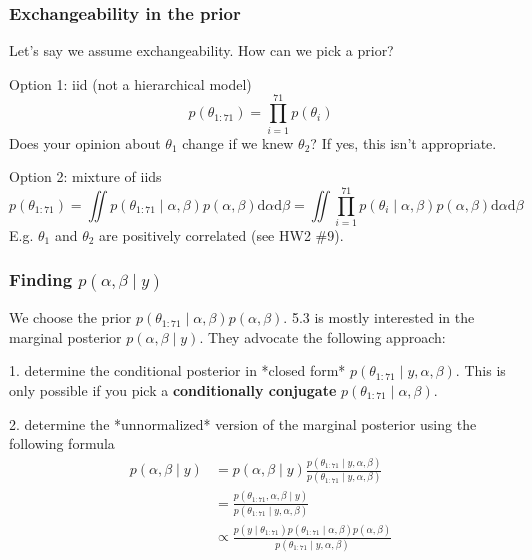 \documentclass{beamer}
\begin{document}
\begin{frame}
\frametitle{Exchangeability in the prior}

Let's say we assume exchangeability. How can we pick a prior?
\newline

Option 1: iid (not a hierarchical model)
\[
p(\theta_{1:71}) = \prod_{i=1}^{71} p(\theta_{i})
\]
Does your opinion about $\theta_1$ change if we knew $\theta_2$? If yes, this isn't appropriate.
\newline

Option 2: mixture of iids
\[
p(\theta_{1:71}) = \iint p(\theta_{1:71} \mid \alpha, \beta)p(\alpha, \beta) \text{d}\alpha\text{d}\beta = \iint \prod_{i=1}^{71} p(\theta_{i} \mid \alpha, \beta)p(\alpha, \beta) \text{d}\alpha\text{d}\beta
\]
E.g. $\theta_1$ and $\theta_2$ are positively correlated (see HW2 \#9). 
\newline


\end{frame}

\begin{frame}
\frametitle{Finding $p(\alpha,\beta \mid y)$ }

We choose the prior $p(\theta_{1:71} \mid \alpha, \beta)p(\alpha, \beta)$. 5.3 is mostly interested in the marginal posterior $p(\alpha, \beta \mid y)$. They advocate the following approach:
\newline

1. determine the conditional posterior in *closed form* $p(\theta_{1:71} \mid y, \alpha, \beta)$. This is only possible if you pick a {\bf conditionally conjugate} $p(\theta_{1:71} \mid \alpha, \beta)$.
\newline
\pause

2. determine the *unnormalized* version of the marginal posterior using the following formula
\begin{align*}
p(\alpha, \beta \mid y) &= p(\alpha, \beta \mid y)\frac{p(\theta_{1:71} \mid y, \alpha, \beta) }{p(\theta_{1:71} \mid y, \alpha, \beta) } \\
&= \frac{p(\theta_{1:71}, \alpha, \beta  \mid y) }{p(\theta_{1:71} \mid y, \alpha, \beta) } \\
&\propto \frac{p(y \mid \theta_{1:71})p(\theta_{1:71} \mid \alpha, \beta)p(\alpha, \beta) }{p(\theta_{1:71} \mid y, \alpha, \beta) }
\end{align*}
\end{frame}
\end{document}
